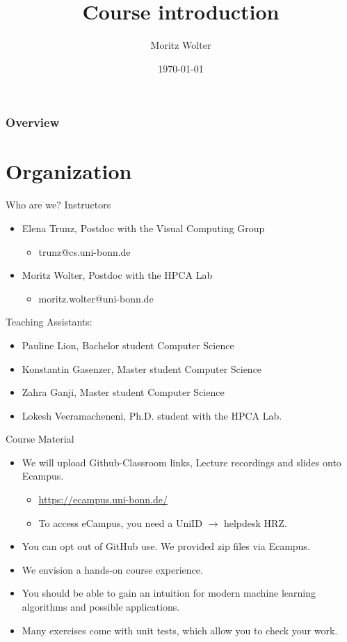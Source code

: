 \documentclass{beamer}
\title{Course introduction}
\date{\today}
\institute{High-Performance Computing and Analytics Lab, Universität Bonn}
\author{Moritz Wolter}
\begin{document}
    \maketitle

    \begin{frame}
    \frametitle{Overview} 
    \tableofcontents
    \end{frame}

    \section{Organization}
    \begin{frame}{Who are we?}
      Instructors
      \begin{itemize}
        \item Elena Trunz, Postdoc with the Visual Computing Group
        \begin{itemize}
          \item trunz@cs.uni-bonn.de
        \end{itemize}
        \item Moritz Wolter, Postdoc with the HPCA Lab
        \begin{itemize}
          \item moritz.wolter@uni-bonn.de
        \end{itemize}
      \end{itemize}
      Teaching Assistants:
      \begin{itemize}
        \item Pauline Lion, Bachelor student Computer Science
        \item Konstantin Gasenzer, Master student Computer Science
        \item Zahra Ganji, Master student Computer Science
        \item Lokesh Veeramacheneni, Ph.D. student with the HPCA Lab.
      \end{itemize}
    \end{frame}

    \begin{frame}{Course Material}
      \begin{itemize}
        \item  We will upload Github-Classroom links, 
               Lecture recordings and slides onto Ecampus.
        \begin{itemize}
          \item \url{https://ecampus.uni-bonn.de/}
          \item To access eCampus, you need a UniID $\rightarrow$ helpdesk HRZ.
        \end{itemize}
        \item You can opt out of GitHub use. We provided zip files via Ecampus.
        \item We envision a hands-on course experience.
        \item You should be able to gain an intuition
              for modern machine learning algorithms and possible applications.
        \item Many exercises come with unit tests, which allow you to check your work.
      \end{itemize}
    \end{frame}
\end{document}
